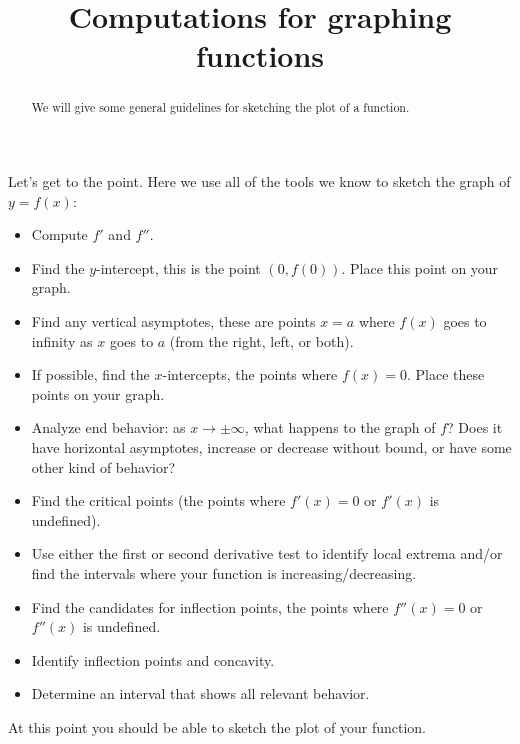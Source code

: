 \documentclass{ximera}
\title[Dig-In:]{Computations for graphing functions}
\begin{document}
\begin{abstract}
  We will give some general guidelines for sketching the plot of a
  function.
\end{abstract}
\maketitle

Let's get to the point. Here we use all of the tools we know to sketch
the graph of $y=f(x)$:


\begin{itemize}
\item Compute $f'$ and $f''$.
\item Find the $y$-intercept, this is the point $(0,f(0))$. Place this
  point on your graph.
\item Find any vertical asymptotes, these are points $x=a$ where
  $f(x)$ goes to infinity as $x$ goes to $a$ (from the right, left, or
  both).
  \item If possible, find the $x$-intercepts, the points where $f(x) =
  0$. Place these points on your graph.
\item Analyze end behavior:  as $x \to \pm \infty$, what happens to the graph of $f$?  Does it  have horizontal asymptotes, increase or decrease without bound, or have some other kind of behavior?
\item Find the critical points (the points where $f'(x) = 0$ or
  $f'(x)$ is undefined).
\item Use either the first or second derivative test to identify local extrema and/or
  find the intervals where your function is increasing/decreasing.
\item Find the candidates for inflection points, the points where
  $f''(x) = 0$ or $f''(x)$ is undefined.
\item Identify inflection points and concavity.

\item Determine an interval that shows all relevant behavior.
\end{itemize}
At this point you should be able to sketch the plot of your function.
\end{document}
